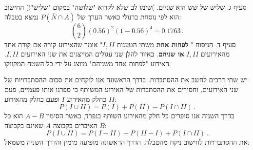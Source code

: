 \documentclass[12pt,a4paper]{article}
\begin{document}
סעיף ג. שליש של שש הוא שניים. )שימו לב שלא לקרוא "שלושה" במקום "שליש"!( החישוב הוא לפי נוסחת ברנולי כאשר הערך של
$P(\overline{N}\cap A)$
נמצא בטבלה:
\[
{6 \choose 2}(0.56)^2 (1-0.56)^4=0.1763\,.
\]
סעיף ד. הניסוח "%
\textbf{לפחות אחת}
משתי הטענות
$I, II$"
אומר שהאירוע קורה אם קורה אחד מהאירועים
$I, II$
\textbf{או שניהם}.
באיור להלן שני עגולים המייצגים את שני האירועים
$I, II$.
האירוע "לפחות אחד משניהם" מיוצג על ידי כל השטח המקווקו.
\begin{center}
\end{center}
יש שתי דרכים לחשב את ההסתברות. בדרך הראשונה אנו לוקחים את סכום ההסתברויות של שני האירועים, וחסירים את ההסתברות של האירוע המשותף כי ספרנו אותו פעמיים, פעם כחלק מהאירוע 
$I$
ופעם כחלק מהאירוע
$II$:
\[
P(I \cup II) = P(I) + P(II) - P(I \cap II)\,.
\]
בדרך השניה אנו סופרים כל חלק מהאירוע השותף בנפרד, כאשר הסימון
$A-B$
הוא כל האיברים בקבוצה 
$A$
שאינם בקבוצה
$B$:
\[
P(I \cup II) = P(I-II) + P(II-I) + P(I \cap II)\,.
\]
את ההסתברויות לחישוב ניקח מהטבלה. הדרך הראשונה מופיעה מימין והדרך השניה משמאל:
\end{document}
